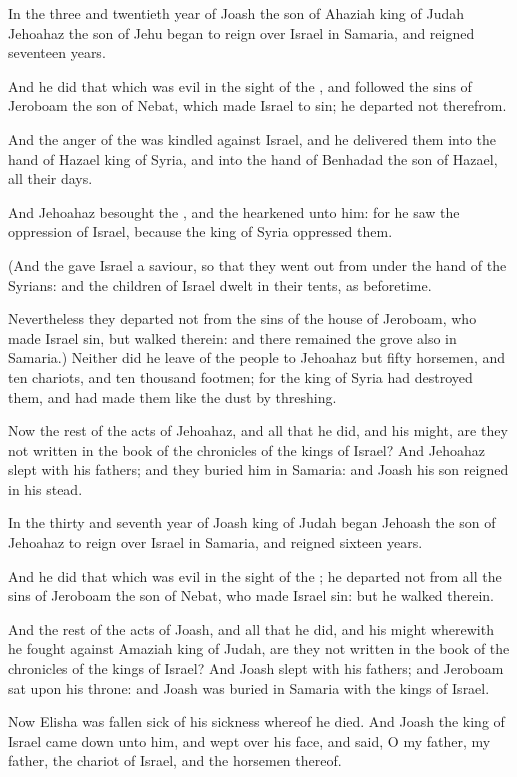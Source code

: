 \Chapter
\Verse In the three and twentieth year of Joash the son of Ahaziah king of Judah Jehoahaz the son of Jehu began to reign over Israel in Samaria, and reigned seventeen years.

\Verse And he did that which was evil in the sight of the \LORD, and followed the sins of Jeroboam the son of Nebat, which made Israel to sin; he departed not therefrom.

\Verse And the anger of the \LORD was kindled against Israel, and he delivered them into the hand of Hazael king of Syria, and into the hand of Benhadad the son of Hazael, all their days.

\Verse And Jehoahaz besought the \LORD, and the \LORD hearkened unto him: for he saw the oppression of Israel, because the king of Syria oppressed them.

\Verse (And the \LORD gave Israel a saviour, so that they went out from under the hand of the Syrians: and the children of Israel dwelt in their tents, as beforetime.

\Verse Nevertheless they departed not from the sins of the house of Jeroboam, who made Israel sin, but walked therein: and there remained the grove also in Samaria.)  \Verse Neither did he leave of the people to Jehoahaz but fifty horsemen, and ten chariots, and ten thousand footmen; for the king of Syria had destroyed them, and had made them like the dust by threshing.

\Verse Now the rest of the acts of Jehoahaz, and all that he did, and his might, are they not written in the book of the chronicles of the kings of Israel?  \Verse And Jehoahaz slept with his fathers; and they buried him in Samaria: and Joash his son reigned in his stead.

\Verse In the thirty and seventh year of Joash king of Judah began Jehoash the son of Jehoahaz to reign over Israel in Samaria, and reigned sixteen years.

\Verse And he did that which was evil in the sight of the \LORD; he departed not from all the sins of Jeroboam the son of Nebat, who made Israel sin: but he walked therein.

\Verse And the rest of the acts of Joash, and all that he did, and his might wherewith he fought against Amaziah king of Judah, are they not written in the book of the chronicles of the kings of Israel?  \Verse And Joash slept with his fathers; and Jeroboam sat upon his throne: and Joash was buried in Samaria with the kings of Israel.

\Verse Now Elisha was fallen sick of his sickness whereof he died. And Joash the king of Israel came down unto him, and wept over his face, and said, O my father, my father, the chariot of Israel, and the horsemen thereof.

